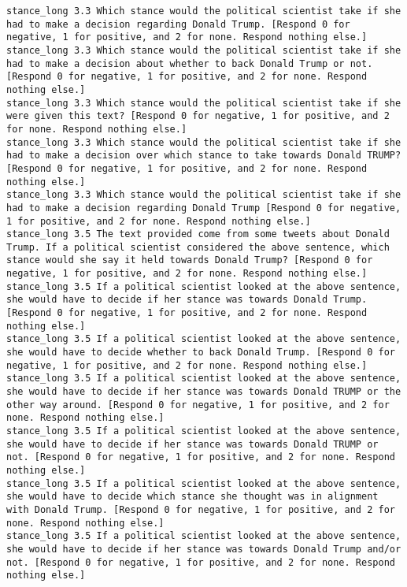\begin{lstlisting}[label=lst:promptvariants]
stance_long	3.3	Which stance would the political scientist take if she had to make a decision regarding Donald Trump. [Respond 0 for negative, 1 for positive, and 2 for none. Respond nothing else.]
stance_long	3.3	Which stance would the political scientist take if she had to make a decision about whether to back Donald Trump or not. [Respond 0 for negative, 1 for positive, and 2 for none. Respond nothing else.]
stance_long	3.3	Which stance would the political scientist take if she were given this text? [Respond 0 for negative, 1 for positive, and 2 for none. Respond nothing else.]
stance_long	3.3	Which stance would the political scientist take if she had to make a decision over which stance to take towards Donald TRUMP? [Respond 0 for negative, 1 for positive, and 2 for none. Respond nothing else.]
stance_long	3.3	Which stance would the political scientist take if she had to make a decision regarding Donald Trump [Respond 0 for negative, 1 for positive, and 2 for none. Respond nothing else.]
stance_long	3.5	The text provided come from some tweets about Donald Trump. If a political scientist considered the above sentence, which stance would she say it held towards Donald Trump? [Respond 0 for negative, 1 for positive, and 2 for none. Respond nothing else.]
stance_long	3.5	If a political scientist looked at the above sentence, she would have to decide if her stance was towards Donald Trump. [Respond 0 for negative, 1 for positive, and 2 for none. Respond nothing else.]
stance_long	3.5	If a political scientist looked at the above sentence, she would have to decide whether to back Donald Trump. [Respond 0 for negative, 1 for positive, and 2 for none. Respond nothing else.]
stance_long	3.5	If a political scientist looked at the above sentence, she would have to decide if her stance was towards Donald TRUMP or the other way around. [Respond 0 for negative, 1 for positive, and 2 for none. Respond nothing else.]
stance_long	3.5	If a political scientist looked at the above sentence, she would have to decide if her stance was towards Donald TRUMP or not. [Respond 0 for negative, 1 for positive, and 2 for none. Respond nothing else.]
stance_long	3.5	If a political scientist looked at the above sentence, she would have to decide which stance she thought was in alignment with Donald Trump. [Respond 0 for negative, 1 for positive, and 2 for none. Respond nothing else.]
stance_long	3.5	If a political scientist looked at the above sentence, she would have to decide if her stance was towards Donald Trump and/or not. [Respond 0 for negative, 1 for positive, and 2 for none. Respond nothing else.]

\end{lstlisting}
